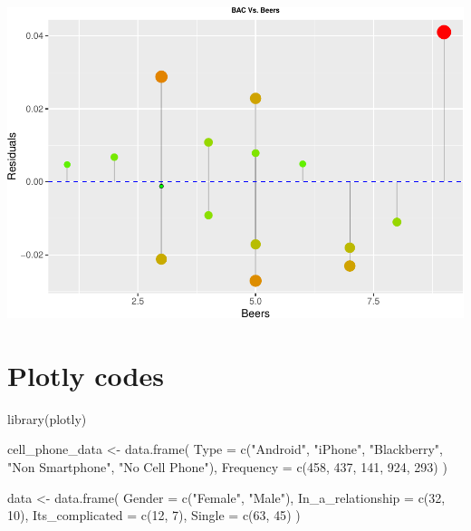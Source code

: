 \documentclass[
]{book}
\newenvironment{Shaded}{\begin{snugshade}}{\end{snugshade}}
\newcommand{\AttributeTok}[1]{\textcolor[rgb]{0.77,0.63,0.00}{#1}}
\newcommand{\DecValTok}[1]{\textcolor[rgb]{0.00,0.00,0.81}{#1}}
\newcommand{\FunctionTok}[1]{\textcolor[rgb]{0.00,0.00,0.00}{#1}}
\newcommand{\NormalTok}[1]{#1}
\newcommand{\OtherTok}[1]{\textcolor[rgb]{0.56,0.35,0.01}{#1}}
\newcommand{\StringTok}[1]{\textcolor[rgb]{0.31,0.60,0.02}{#1}}
\begin{document}
\includegraphics[width=1\linewidth]{Cool_R_codes_files/figure-latex/unnamed-chunk-2-1}

\hypertarget{plotly-codes}{%
\section{Plotly codes}\label{plotly-codes}}

\begin{Shaded}
\begin{Highlighting}[]
\FunctionTok{library}\NormalTok{(plotly)}

\NormalTok{cell\_phone\_data }\OtherTok{\textless{}{-}} \FunctionTok{data.frame}\NormalTok{(}
  \AttributeTok{Type =} \FunctionTok{c}\NormalTok{(}\StringTok{"Android"}\NormalTok{, }\StringTok{"iPhone"}\NormalTok{, }\StringTok{"Blackberry"}\NormalTok{, }\StringTok{"Non Smartphone"}\NormalTok{, }\StringTok{"No Cell Phone"}\NormalTok{),}
  \AttributeTok{Frequency =} \FunctionTok{c}\NormalTok{(}\DecValTok{458}\NormalTok{, }\DecValTok{437}\NormalTok{, }\DecValTok{141}\NormalTok{, }\DecValTok{924}\NormalTok{, }\DecValTok{293}\NormalTok{)}
\NormalTok{)}

\NormalTok{data }\OtherTok{\textless{}{-}} \FunctionTok{data.frame}\NormalTok{(}
  \AttributeTok{Gender =} \FunctionTok{c}\NormalTok{(}\StringTok{"Female"}\NormalTok{, }\StringTok{"Male"}\NormalTok{),}
  \AttributeTok{In\_a\_relationship =} \FunctionTok{c}\NormalTok{(}\DecValTok{32}\NormalTok{, }\DecValTok{10}\NormalTok{),}
  \AttributeTok{Its\_complicated =} \FunctionTok{c}\NormalTok{(}\DecValTok{12}\NormalTok{, }\DecValTok{7}\NormalTok{),}
  \AttributeTok{Single =} \FunctionTok{c}\NormalTok{(}\DecValTok{63}\NormalTok{, }\DecValTok{45}\NormalTok{)}
\NormalTok{)}
\end{Highlighting}
\end{Shaded}
\end{document}
